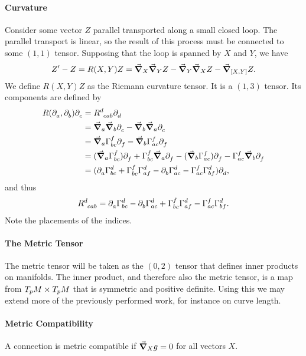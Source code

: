 \paragraph{Curvature}
Consider some vector $Z$ parallel transported along a small closed loop. The parallel transport is linear, so the result of this process must be connected to some $(1, 1)$ tensor. Supposing that the loop is spanned by $X$ and $Y$, we have
\begin{align*}
Z^{\prime} - Z = R(X, Y)Z = \dcov{X}{\dcov{Y}{Z}} - \dcov{Y}{\dcov{X}{Z}} - \dcov{\comm{X}{Y}}{Z}.
\end{align*}
We define $R(X, Y)Z$ as the Riemann curvature tensor. It is a $(1, 3)$ tensor. Its components are defined by
\begin{align*}
R(\del{a}{}, \del{b}{})\del{c}{} &= \tensor{R}{^{d}_{cab}}\del{d}{} \\
&= \dcov{a}{\dcov{b}{\del{c}{}}} - \dcov{b}{\dcov{a}{\del{c}{}}} \\
&= \dcov{a}{\chris{f}{b}{c}\del{f}{}} - \dcov{b}{\chris{f}{a}{c}\del{f}{}} \\
&= (\dcov{a}{\chris{f}{b}{c}})\del{f}{} + \chris{f}{b}{c}\dcov{a}{\del{f}{}} - (\dcov{b}{\chris{f}{a}{c}})\del{f}{} - \chris{f}{a}{c}\dcov{b}{\del{f}{}} \\
&= (\del{a}{\chris{d}{b}{c}} + \chris{f}{b}{c}\chris{d}{a}{f} - \del{b}{\chris{d}{a}{c}} - \chris{f}{a}{c}\chris{d}{b}{f})\del{d}{}, 
\end{align*}
and thus
\begin{align*}
\tensor{R}{^{d}_{cab}} = \del{a}{\chris{d}{b}{c}} - \del{b}{\chris{d}{a}{c}} + \chris{f}{b}{c}\chris{d}{a}{f} - \chris{f}{a}{c}\chris{d}{b}{f}.
\end{align*}
Note the placements of the indices.

\paragraph{The Metric Tensor}
The metric tensor will be taken as the $(0, 2)$ tensor that defines inner products on manifolds. The inner product, and therefore also the metric tensor, is a map from $T_{p}M\times T_{p}M$ that is symmetric and positive definite. Using this we may extend more of the previously performed work, for instance on curve length.

\paragraph{Metric Compatibility}
A connection is metric compatible if $\grad_{X}{g} = 0$ for all vectors $X$.

